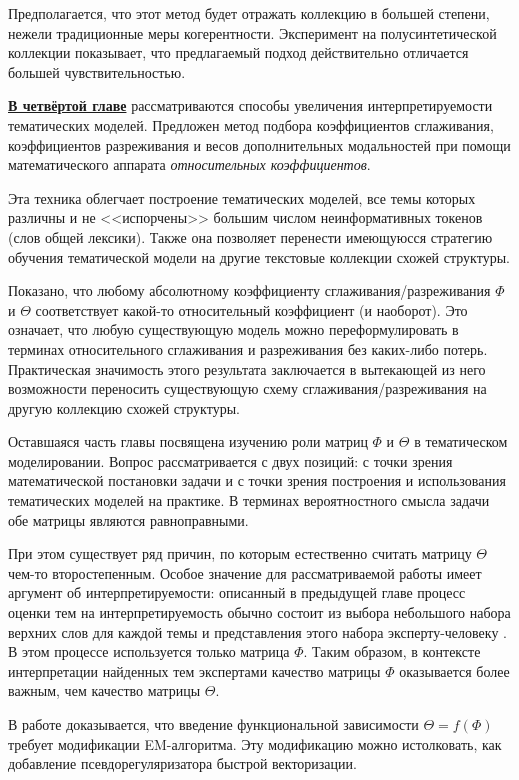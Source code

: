Предполагается, что этот метод будет отражать коллекцию в большей степени, нежели традиционные меры когерентности. Эксперимент на полусинтетической коллекции показывает, что предлагаемый подход действительно отличается большей чувствительностью.

\underline{\textbf{В четвёртой главе}} рассматриваются способы увеличения интерпретируемости тематических моделей. Предложен метод подбора коэффициентов сглаживания, коэффициентов разреживания и весов дополнительных модальностей при помощи математического аппарата \textit{относительных коэффициентов}.

Эта техника облегчает построение тематических моделей, все темы которых различны и не <<испорчены>> большим числом неинформативных токенов (слов общей лексики). Также она позволяет перенести имеющуюсся стратегию обучения тематической модели на
другие текстовые коллекции схожей структуры.

Показано, что любому абсолютному коэффициенту сглаживания/разреживания $\Phi$ и $\Theta$ соответствует какой-то относительный коэффициент (и наоборот). Это означает, что любую существующую модель можно переформулировать в терминах относительного сглаживания и разреживания без каких-либо потерь. Практическая значимость этого результата заключается в вытекающей из него возможности переносить существующую схему сглаживания/разреживания на другую коллекцию схожей структуры.

Оставшаяся часть главы посвящена изучению роли матриц $\Phi$ и $\Theta$ в тематическом моделировании. Вопрос рассматривается с двух позиций: с точки зрения математической постановки задачи и с точки зрения построения и использования тематических моделей на практике. В терминах вероятностного смысла задачи обе матрицы являются равноправными.

При этом существует ряд причин, по которым естественно считать матрицу $\Theta$ чем-то второстепенным. Особое значение для рассматриваемой работы имеет аргумент об интерпретируемости: описанный в предыдущей главе процесс оценки тем на интерпретируемость обычно состоит из выбора небольшого набора верхних слов для каждой темы и представления этого набора эксперту-человеку \cite{roder2015exploring}. В этом процессе используется только матрица $\Phi$. Таким образом, в контексте интерпретации найденных тем экспертами качество матрицы $\Phi$ оказывается более важным, чем качество матрицы $\Theta$.

В работе \cite{thetaless} доказывается, что введение функциональной зависимости $\Theta = f(\Phi)$ требует модификации EM-алгоритма. Эту модификацию можно истолковать, как добавление псевдорегуляризатора быстрой векторизации.

